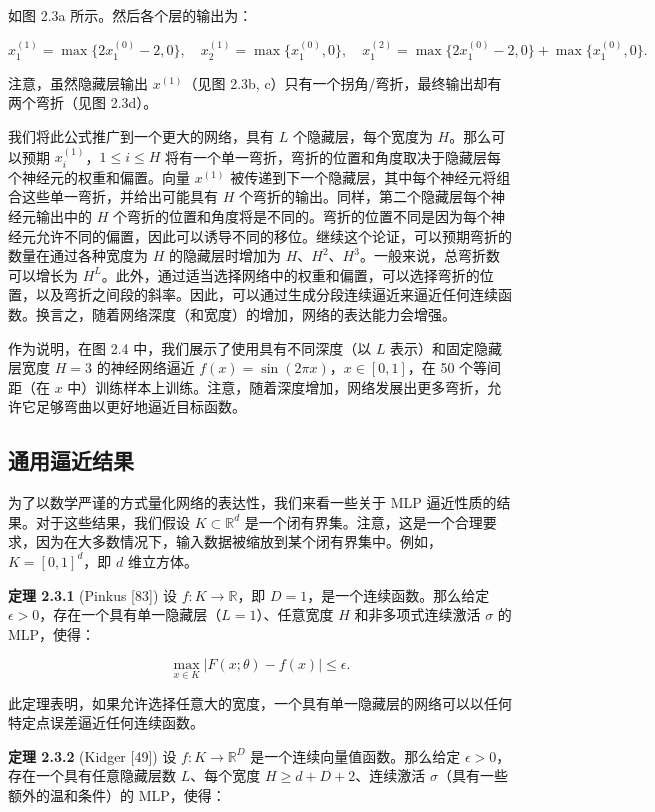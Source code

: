 如图 2.3a 所示。然后各个层的输出为：

\[
x^{(1)}_1 = \max\{2x^{(0)}_1 - 2, 0\}, \quad x^{(1)}_2 = \max\{x^{(0)}_1, 0\}, \quad x^{(2)}_1 = \max\{2x^{(0)}_1 - 2, 0\} + \max\{x^{(0)}_1, 0\}.
\]

注意，虽然隐藏层输出 $x^{(1)}$（见图 2.3b, c）只有一个拐角/弯折，最终输出却有两个弯折（见图 2.3d）。

我们将此公式推广到一个更大的网络，具有 $L$ 个隐藏层，每个宽度为 $H$。那么可以预期 $x^{(1)}_i$，$1 \leq i \leq H$ 将有一个单一弯折，弯折的位置和角度取决于隐藏层每个神经元的权重和偏置。向量 $x^{(1)}$ 被传递到下一个隐藏层，其中每个神经元将组合这些单一弯折，并给出可能具有 $H$ 个弯折的输出。同样，第二个隐藏层每个神经元输出中的 $H$ 个弯折的位置和角度将是不同的。弯折的位置不同是因为每个神经元允许不同的偏置，因此可以诱导不同的移位。继续这个论证，可以预期弯折的数量在通过各种宽度为 $H$ 的隐藏层时增加为 $H$、$H^2$、$H^3$。一般来说，总弯折数可以增长为 $H^L$。此外，通过适当选择网络中的权重和偏置，可以选择弯折的位置，以及弯折之间段的斜率。因此，可以通过生成分段连续逼近来逼近任何连续函数。换言之，随着网络深度（和宽度）的增加，网络的表达能力会增强。

作为说明，在图 2.4 中，我们展示了使用具有不同深度（以 $L$ 表示）和固定隐藏层宽度 $H=3$ 的神经网络逼近 $f(x) = \sin(2\pi x)$，$x \in [0,1]$，在 50 个等间距（在 $x$ 中）训练样本上训练。注意，随着深度增加，网络发展出更多弯折，允许它足够弯曲以更好地逼近目标函数。

\subsection{通用逼近结果}

为了以数学严谨的方式量化网络的表达性，我们来看一些关于 MLP 逼近性质的结果。对于这些结果，我们假设 $K \subset \mathbb{R}^d$ 是一个闭有界集。注意，这是一个合理要求，因为在大多数情况下，输入数据被缩放到某个闭有界集中。例如，$K = [0,1]^d$，即 $d$ 维立方体。

\textbf{定理 2.3.1} (Pinkus [83]) 设 $f: K \to \mathbb{R}$，即 $D=1$，是一个连续函数。那么给定 $\epsilon > 0$，存在一个具有单一隐藏层（$L=1$）、任意宽度 $H$ 和非多项式连续激活 $\sigma$ 的 MLP，使得：

\[
\max_{x \in K} |F(x; \theta) - f(x)| \leq \epsilon.
\]

此定理表明，如果允许选择任意大的宽度，一个具有单一隐藏层的网络可以以任何特定点误差逼近任何连续函数。

\textbf{定理 2.3.2} (Kidger [49]) 设 $f: K \to \mathbb{R}^D$ 是一个连续向量值函数。那么给定 $\epsilon > 0$，存在一个具有任意隐藏层数 $L$、每个宽度 $H \geq d + D + 2$、连续激活 $\sigma$（具有一些额外的温和条件）的 MLP，使得：

